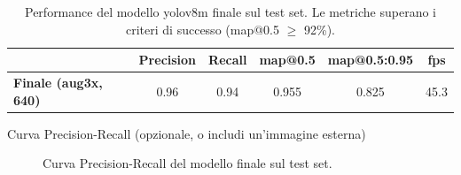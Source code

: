 \documentclass[12pt,a4paper,openright,twoside]{book}
\begin{document}
\begin{table}[t]
  \centering
  \caption{Performance del modello \ac{yolo}v8m finale sul test set. 
  Le metriche superano i criteri di successo (\ac{map}@0.5 $\geq$ 92\%).}
  \label{tab:player_detector_final_results}
  \begin{tabular}{l S[table-format=1.3] S[table-format=1.3] S[table-format=1.3] S[table-format=1.3] S[table-format=2.1]}
    \toprule
    & {\textbf{Precision}} & {\textbf{Recall}} & {\textbf{\ac{map}@0.5}} & {\textbf{\ac{map}@0.5:0.95}} & {\textbf{\ac{fps}}} \\
    \midrule
    \textbf{Finale (aug3x, 640)} 
      & 0.96 & 0.94 & 0.955 & 0.825 & 45.3 \\
    \bottomrule
  \end{tabular}
\end{table}

\begin{table}[h]
  \centering
  \caption{Performance del modello \ac{yolo}v8m finale sul test set. Le metriche superano i criteri di successo definiti 
  (\ac{map}@0.5 $\geq$ 92\%), confermando l'elevata accuratezza del detector.}
  \label{tab:player_detector_final_results}
\end{table}

Curva Precision-Recall (opzionale, o includi un'immagine esterna)

\begin{figure}[t]
  \centering
  \caption{Curva Precision-Recall del modello finale sul test set.}
  \label{fig:pr_curve_final}
\end{figure}
\end{document}
